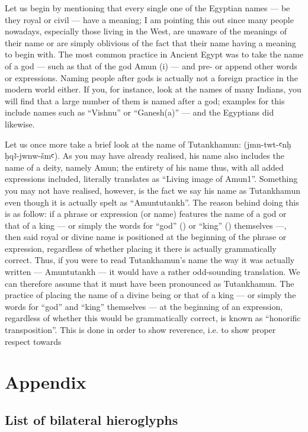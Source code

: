 \documentclass[a5paper,twoside,11pt]{report}
\begin{document}
	Let us begin by mentioning that every single one of the Egyptian names — be they royal or civil — have a meaning; I am pointing this out since many people nowadays, especially those living in the West, are unaware of the meanings of their name or are simply oblivious of the fact that their name having a meaning to begin with. The most common practice in Ancient Egypt was to take the name of a god — such as that of the god Amun (i) — and pre- or append other words or expressions. Naming people after gods is actually not a foreign practice in the modern world either. If you, for instance, look at the names of many Indians, you will find that a large number of them is named after a god; examples for this include names such as “Vishnu” or “Ganesh(a)” — and the Egyptians did likewise. 
	
	Let us once more take a brief look at the name of Tutankhamun:  (jmn-twt-ꜥnḫ ḥqꜣ-jwnw-šmꜥ). As you may have already realised, his name also includes the name of a deity, namely Amun; the entirety of his name thus, with all added expressions included, literally translates as “Living image of Amun1”. Something you may not have realised, however, is the fact we say his name as Tutankhamun even though it is actually spelt as “Amuntutankh”. The reason behind doing this is as follow: if a phrase or expression (or name) features the name of a god or that of a king — or simply the words for “god” () or “king” () themselves —, then said royal or divine name is positioned at the beginning of the phrase or expression, regardless of whether placing it there is actually grammatically correct. Thus, if you were to read Tutankhamun’s name the way it was actually written — Amuntutankh — it would have a rather odd-sounding translation. We can therefore assume that it must have been pronounced as Tutankhamun. The practice of placing the name of a divine being or that of a king — or simply the words for “god” and “king” themselves — at the beginning of an expression, regardless of whether this would be grammatically correct, is known as “honorific transposition”. This is done in order to show reverence, i.e. to show proper respect towards


	\part*{Appendix}

  \chapter*{List of bilateral hieroglyphs}
    \label{bitri}
\end{document}
